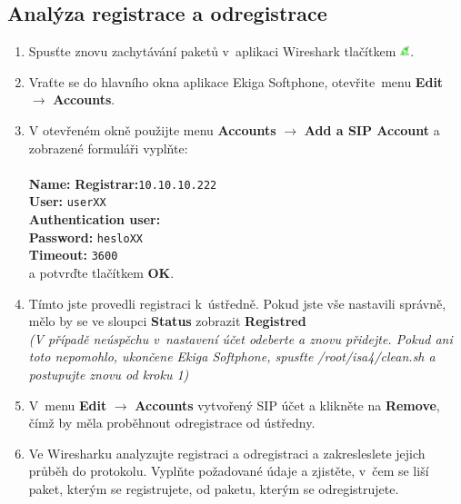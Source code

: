 \subsection{Analýza registrace a odregistrace}
\begin{enumerate}
    \item Spusťte znovu zachytávání paketů v aplikaci Wireshark tlačítkem \includegraphics[width=3mm]{img/ws_start.png}.
    \item Vraťte se do hlavního okna aplikace Ekiga Softphone, otevřite menu {\bf Edit} $\rightarrow$ {\bf Accounts}.
    \item V otevřeném okně použijte menu {\bf Accounts} $\rightarrow$ {\bf Add a SIP Account} a zobrazené formuláři vyplňte: \\
    ~\\
    {\bf Name:} {\tt <Vaše jméno>}
    {\bf Registrar:}{\tt 10.10.10.222} \\
    {\bf User:} 	{\tt userXX} \\
    {\bf Authentication user:} 	{\tt <nechte prázdné>} \\
    {\bf Password:}	{\tt hesloXX} \\
    {\bf Timeout:} {\tt 3600}
    ~\\
    a potvrďte tlačítkem {\bf OK}.
    \item Tímto jste provedli registraci k ústředně. Pokud jste vše nastavili správně, mělo by se ve sloupci {\bf Status} zobrazit {\bf Registred} \\
    {\it (V případě neúspěchu v nastavení účet odeberte a znovu přidejte. Pokud ani toto nepomohlo, ukončene Ekiga Softphone, spusťte /root/isa4/clean.sh a postupujte znovu od kroku 1)}
    \item V menu {\bf Edit} $\rightarrow$ {\bf Accounts} vytvořený SIP účet a klikněte na {\bf Remove}, čímž by měla proběhnout odregistrace od ústředny.
    \item Ve Wiresharku analyzujte registraci a odregistraci a zakresleslete jejich průběh do protokolu. Vyplňte požadované údaje a zjistěte, v čem se liší paket, kterým se registrujete, od paketu, kterým se odregistrujete.
\end{enumerate}


